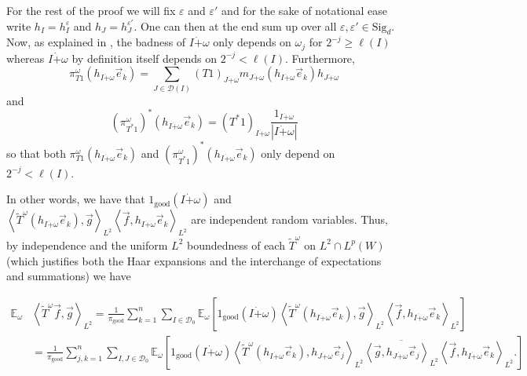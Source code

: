 \documentclass[12pt,reqno ]{amsart}
\numberwithin{equation}{section}
\theoremstyle{definition}
\newcommand{\Ew}{\ensuremath{\mathbb{E}_\omega}}
\newcommand{\D}{\ensuremath{\mathscr{D}}}
\newcommand{\V}[1]{\ensuremath{\vec{#1}}}
\newcommand{\ip}[2]{\ensuremath{\left\langle#1,#2\right\rangle}}
\newcommand{\W}[1]{\ensuremath{\widetilde{#1}}}
\renewcommand{\S}{\ensuremath{\text{Sig}_d}}
\begin{document}
For the rest of the proof we will fix $\varepsilon$ and $\varepsilon'$ and for the sake of notational ease write $h_I = h_I ^\varepsilon$ and $h_J = h_J ^{\varepsilon '}$.  One can then at the end sum up over all $\varepsilon, \varepsilon' \in \S$.  Now, as explained in \cite{H}, the badness of $I \dot+ \omega$ only depends on $\omega_j$ for $2^{-j} \geq \ell(I)$ whereas $I \dot+ \omega$ by definition itself depends on $2^{-j} < \ell(I)$.  Furthermore, \begin{equation*} \pi_{T1} ^\omega (h_{I \dot+ \omega} \V{e}_k) = \sum_{J \in \D (I)} (T1)_{J \dot+ \omega} m_{J \dot+ \omega} (h_{I \dot+ \omega} \V{e}_k) h_{J \dot+\omega} \end{equation*} and \begin{equation*}  (\pi_{T^*1} ^\omega)^* (h_{I \dot+ \omega} \V{e}_k)  = (T^*1)_{I \dot+ \omega} \frac{1_{I \dot+ \omega}}{|I \dot+ \omega|} \end{equation*} so that both $\pi_{T1} ^\omega (h_{I \dot+ \omega} \V{e}_k)$ and  $(\pi_{T^*1} ^\omega)^* (h_{I \dot+ \omega} \V{e}_k)$ only depend on $2^{-j} < \ell(I)$.

In other words, we have that $1_\text{good} (I \dot+ \omega)$ and $\ip{\widetilde{T} ^\omega (h_{I \dot+ \omega} \V{e}_k)}{ \vec{g}}_{L^2} \ip{\vec{f}}{ h_{I \dot+ \omega} \V{e}_k}_{L^2}$ are independent random variables.  Thus, by independence and the uniform $L^2$ boundedness of each $\W{T}^\omega$ on $L^2 \cap L^p(W)$ (which justifies both the Haar expansions and the interchange of expectations and summations)  we have

\begin{align*} \Ew & \ip{\widetilde{T}^\omega \vec{f}}{\vec{g}}_{L^2}  = \frac{1}{\pi_{\text{good}}} \sum_{k = 1}^n  \sum_{I \in \D_0 } \Ew  \left[1_\text{good} (I \dot+ \omega) \ip{\widetilde{T} ^\omega (h_{I \dot+ \omega} \V{e}_k)}{ \vec{g}}_{L^2} \ip{\vec{f}}{ h_{I \dot+ \omega} \V{e}_k}_{L^2}\right] \\ & = \frac{1}{\pi_{\text{good}}} \sum_{j, k = 1}^n  \sum_{I, J \in \D_0 }   \Ew  \left[1_\text{good} (I \dot+ \omega) \ip{\widetilde{T} ^\omega (h_{I \dot+ \omega} \V{e}_k )}{ h_{J \dot+ \omega} \V{e}_j}_{L^2} \overline{\ip{\vec{g}}{h_{J \dot+ \omega} \V{e}_j }_{L^2}}  \ip{\vec{f}}{ h_{I \dot +\omega} \V{e}_k}_{L^2}.\right] \end{align*}
\end{document}
